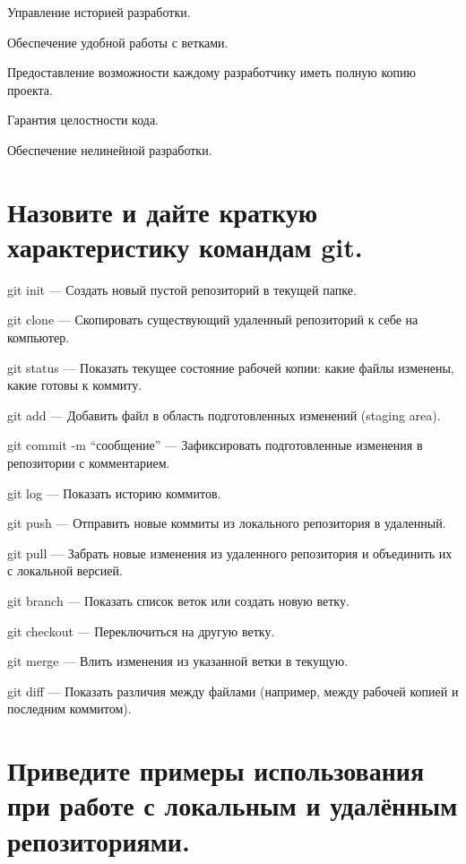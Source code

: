 \documentclass[
  english,
  russian,
  12pt,
  a4paper,
  DIV=11,
  numbers=noendperiod]{scrreprt}
\begin{document}
Управление историей разработки.

Обеспечение удобной работы с ветками.

Предоставление возможности каждому разработчику иметь полную копию
проекта.

Гарантия целостности кода.

Обеспечение нелинейной разработки.

\section{Назовите и дайте краткую характеристику командам
git.}\label{ux43dux430ux437ux43eux432ux438ux442ux435-ux438-ux434ux430ux439ux442ux435-ux43aux440ux430ux442ux43aux443ux44e-ux445ux430ux440ux430ux43aux442ux435ux440ux438ux441ux442ux438ux43aux443-ux43aux43eux43cux430ux43dux434ux430ux43c-git.}

git init --- Создать новый пустой репозиторий в текущей папке.

git clone --- Скопировать существующий удаленный репозиторий к себе на
компьютер.

git status --- Показать текущее состояние рабочей копии: какие файлы
изменены, какие готовы к коммиту.

git add --- Добавить файл в область подготовленных изменений (staging
area).

git commit -m \enquote{сообщение} --- Зафиксировать подготовленные
изменения в репозитории с комментарием.

git log --- Показать историю коммитов.

git push --- Отправить новые коммиты из локального репозитория в
удаленный.

git pull --- Забрать новые изменения из удаленного репозитория и
объединить их с локальной версией.

git branch --- Показать список веток или создать новую ветку.

git checkout --- Переключиться на другую ветку.

git merge --- Влить изменения из указанной ветки в текущую.

git diff --- Показать различия между файлами (например, между рабочей
копией и последним коммитом).

\section{Приведите примеры использования при работе с локальным и
удалённым
репозиториями.}\label{ux43fux440ux438ux432ux435ux434ux438ux442ux435-ux43fux440ux438ux43cux435ux440ux44b-ux438ux441ux43fux43eux43bux44cux437ux43eux432ux430ux43dux438ux44f-ux43fux440ux438-ux440ux430ux431ux43eux442ux435-ux441-ux43bux43eux43aux430ux43bux44cux43dux44bux43c-ux438-ux443ux434ux430ux43bux451ux43dux43dux44bux43c-ux440ux435ux43fux43eux437ux438ux442ux43eux440ux438ux44fux43cux438.}
\end{document}

